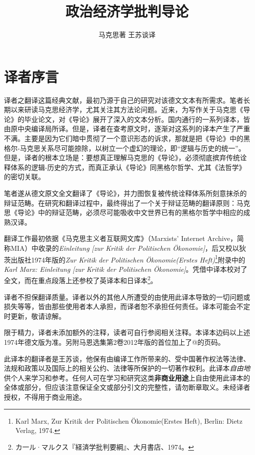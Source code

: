 \documentclass[a5paper,twoside,10.5pt]{ctexart}
\title{政治经济学批判导论}
\author{马克思著 \quad 王苏谈译}
\begin{document}
\maketitle

\newpage

\tableofcontents

\newpage

\section{译者序言}

译者之翻译这篇经典文献，最初乃源于自己的研究对该德文文本有所需求。笔者长期以来研读马克思经济学，尤其关注其方法论问题。近来，为写作关于马克思《导论》的毕业论文，对《导论》展开了深入的文本分析。国内通行的一系列译本，皆由原中央编译局所译。但是，译者在查考原文时，逐渐对这系列的译本产生了严重不满。主要是因为它们暗中贯彻了一个意识形态的诉求，那就是把《导论》中的黑格尔-马克思关系尽可能捺除，以树立一个虚幻的理论，即“逻辑与历史的统一”。但是，译者的根本立场是：要想真正理解马克思的《导论》，必须彻底摈弃传统诠释体系的逻辑-历史的方式，而真正承认《导论》同黑格尔哲学、尤其《法哲学》的密切关联。

笔者遂从德文原文全文翻译了《导论》，并力图恢复被传统诠释体系所刻意抹杀的辩证范畴。在研究和翻译过程中，最终得出了一个关于辩证范畴的翻译原则：马克思《导论》中的辩证范畴，必须尽可能吸收中文世界已有的黑格尔哲学中相应的成熟汉译。

翻译工作最初依据《马克思主义者互联网文库》（Marxists’ Internet Archive，简称MIA）中收录的\textit{Einleitung [zur Kritik der Politischen Ökonomie]}，后又校以狄茨出版社1974年版的\textit{Zur Kritik der Politischen Ökonomie(Erstes Heft)}\footnote{Karl Marx, Zur Kritik der Politischen Ökonomie(Erstes Heft), Berlin: Dietz Verlag, 1974. }附录中的\textit{Karl Marx: Einleitung [zur Kritik der Politischen Ökonomie]}。凭借中译本校对了全文，而在重点段落上还参校了英译本和日译本\footnote{\mincho カ一ル·マルクス『経済学批判要綱』、大月書店、1974。}。

译者不担保翻译质量。译者以外的其他人所遭受的由使用此译本导致的一切问题或损失等等，皆由那些使用者本人承担，而译者恕不承担任何责任。译本可能会不定时更新，敬请谅解。

限于精力，译者未添加额外的注释，读者可自行参阅相关注释。本译本边码以上述1974年德文版为准。另附马恩选集第2卷2012年版的首位加上了@的页码。

此译本的翻译者是王苏谈，他保有由编译工作所带来的、受中国著作权法等法律、法规和政策以及国际上的相关公约、法律等所保护的一切著作权利。此译本\textit{自由地}供个人来学习和参考。任何人可在学习和研究这类\textbf{非商业用途}上自由使用此译本的全体或部分，但应该注意保证全文或部分引文的完整性，请勿断章取义。未经译者授权，不得用于商业用途。
\end{document}
